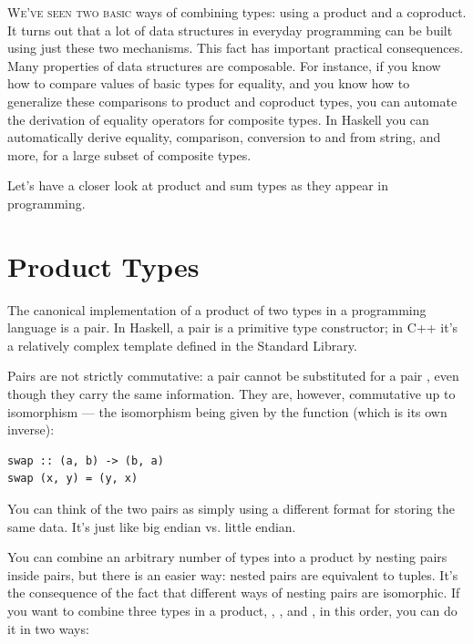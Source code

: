 \lettrine[lhang=0.17]{W}{e've seen two basic} ways of combining types: using a product and a
coproduct. It turns out that a lot of data structures in everyday
programming can be built using just these two mechanisms. This fact has
important practical consequences. Many properties of data structures are
composable. For instance, if you know how to compare values of basic
types for equality, and you know how to generalize these comparisons to
product and coproduct types, you can automate the derivation of equality
operators for composite types. In Haskell you can automatically derive
equality, comparison, conversion to and from string, and more, for a
large subset of composite types.

Let's have a closer look at product and sum types as they appear in
programming.

\section{Product Types}\label{product-types}

The canonical implementation of a product of two types in a programming
language is a pair. In Haskell, a pair is a primitive type constructor;
in C++ it's a relatively complex template defined in the Standard
Library.

\begin{figure}
\centering
{}
\end{figure}

\noindent
Pairs are not strictly commutative: a pair  cannot
be substituted for a pair , even though they carry
the same information. They are, however, commutative up to isomorphism
--- the isomorphism being given by the  function (which is
its own inverse):

\begin{Verbatim}
swap :: (a, b) -> (b, a)
swap (x, y) = (y, x)
\end{Verbatim}
You can think of the two pairs as simply using a different format for
storing the same data. It's just like big endian vs. little endian.

You can combine an arbitrary number of types into a product by nesting
pairs inside pairs, but there is an easier way: nested pairs are
equivalent to tuples. It's the consequence of the fact that different
ways of nesting pairs are isomorphic. If you want to combine three types
in a product, , , and , in this order, you
can do it in two ways:

